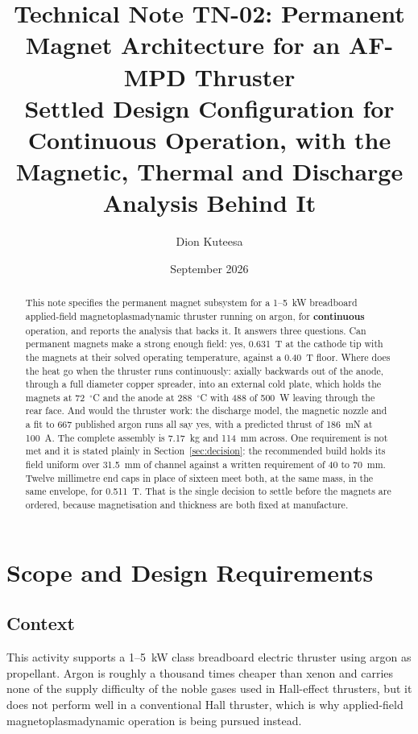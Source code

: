\documentclass[11pt,a4paper]{article}
\title{\textbf{Technical Note TN-02: Permanent Magnet Architecture
for an AF-MPD Thruster} \\
\large Settled Design Configuration for Continuous Operation, with the
Magnetic, Thermal and Discharge Analysis Behind It}
\author{Dion Kuteesa}
\date{September 2026}
\newcommand{\degC}{$^\circ$C}
\begin{document}
\maketitle

\begin{abstract}
This note specifies the permanent magnet subsystem for a 1--5~kW breadboard
applied-field magnetoplasmadynamic thruster running on argon, for
\textbf{continuous} operation, and reports the analysis that backs it. It
answers three questions. Can permanent magnets make a strong enough field:
yes, 0.631~T at the cathode tip with the magnets at their solved operating
temperature, against a 0.40~T floor. Where does the heat go when the thruster
runs continuously: axially backwards out of the anode, through a full diameter
copper spreader, into an external cold plate, which holds the magnets at
72~\degC{} and the anode at 288~\degC{} with 488 of 500~W leaving through the
rear face. And would the thruster work: the discharge model, the magnetic
nozzle and a fit to 667 published argon runs all say yes, with a predicted
thrust of 186~mN at 100~A. The complete assembly is 7.17~kg and 114~mm across.
One requirement is not met and it is stated plainly in
Section~\ref{sec:decision}: the recommended build holds its field uniform over
31.5~mm of channel against a written requirement of 40 to 70~mm. Twelve
millimetre end caps in place of sixteen meet both, at the same mass, in the
same envelope, for 0.511~T. That is the single decision to settle before the
magnets are ordered, because magnetisation and thickness are both fixed at
manufacture.
\end{abstract}

\tableofcontents
\newpage

\section{Scope and Design Requirements}

\subsection{Context}
This activity supports a 1--5~kW class breadboard electric thruster using argon
as propellant. Argon is roughly a thousand times cheaper than xenon and carries
none of the supply difficulty of the noble gases used in Hall-effect thrusters,
but it does not perform well in a conventional Hall thruster, which is why
applied-field magnetoplasmadynamic operation is being pursued instead.
\end{document}
